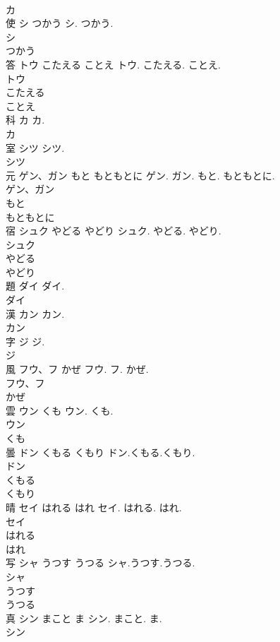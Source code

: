 \documentclass[8pt]{extreport}
\begin{document}
\begin{CJK}{UTF8}{min}
\\	カ
\\	使	シ つかう	シ. つかう.	
\\	シ
\\	つかう
\\	答	トウ こたえる ことえ	トウ. こたえる. ことえ.	
\\	トウ
\\	こたえる
\\	ことえ
\\	科	カ	カ.	
\\	カ
\\	室	シツ	シツ.	
\\	シツ
\\	元	ゲン、ガン もと もともとに	ゲン. ガン. もと. もともとに.	
\\	ゲン、ガン
\\	もと
\\	もともとに
\\	宿	シュク やどる やどり	シュク. やどる. やどり.	
\\	シュク
\\	やどる
\\	やどり
\\	題	ダイ	ダイ.	
\\	ダイ
\\	漢	カン	カン.	
\\	カン
\\	字	ジ	ジ.	
\\	ジ
\\	風	フウ、フ かぜ	フウ. フ. かぜ.	
\\	フウ、フ
\\	かぜ
\\	雲	ウン くも	ウン. くも.	
\\	ウン
\\	くも
\\	曇	ドン くもる くもり	ドン.くもる.くもり.	
\\	ドン
\\	くもる
\\	くもり
\\	晴	セイ はれる はれ	セイ. はれる. はれ.	
\\	セイ
\\	はれる
\\	はれ
\\	写	シャ うつす うつる	シャ.うつす.うつる.	
\\	シャ
\\	うつす
\\	うつる
\\	真	シン まこと ま	シン. まこと. ま.	
\\	シン

\end{CJK}
\end{document}
